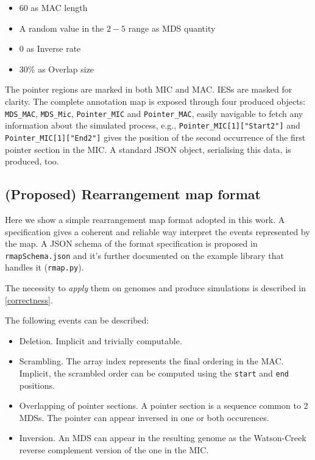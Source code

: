\begin{itemize}
	\item $60$ as MAC length
	\item A random value in the $2-5$ range as MDS quantity
	\item $0$ as Inverse rate
	\item $30\%$ as Overlap size
\end{itemize}

The pointer regions are marked in both MIC and MAC. IESs are masked for clarity. The complete annotation map is exposed through four produced objects: \texttt{MDS\_MAC}, \texttt{MDS\_Mic}, \texttt{Pointer\_MIC} and \texttt{Pointer\_MAC}, easily navigable to fetch any information about the simulated process, e.g., \texttt{Pointer\_MIC[1]["Start2"]} and \texttt{Pointer\_MIC[1]["End2"]} gives the position of the second occurrence of the first pointer section in the MIC. A standard JSON object, serialising this data, is produced, too.

\subsection{(Proposed) Rearrangement map format}
\label{rmap}
Here we show a simple rearrangement map format adopted in this work. A specification gives a coherent and reliable way interpret the events represented by the map.
A JSON schema of the format specification is proposed in \texttt{rmapSchema.json} and it's further documented on the example library that handles it (\texttt{rmap.py}).

The necessity to \textit{apply} them on genomes and produce simulations is described in \ref{correctness}.

The following events can be described:

\begin{itemize}
	\item Deletion. Implicit and trivially computable.
	\item Scrambling. The array index represents the final ordering in the MAC. Implicit, the scrambled order can be computed using the \texttt{start} and \texttt{end} positions.
	\item Overlapping of pointer sections. A pointer section is a sequence common to 2 MDSs. The pointer can appear inversed in one or both occurences.
	\item Inversion. An MDS can appear in the resulting genome as the Watson-Creek reverse complement version of the one in the MIC.
\end{itemize}

